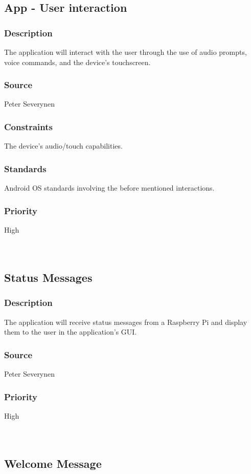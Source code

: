 \subsection{App - User interaction}
\subsubsection{Description}
The application will interact with the user through the use of audio prompts, voice commands, and the device's touchscreen.
\subsubsection{Source}
Peter Severynen
\subsubsection{Constraints}
The device's audio/touch capabilities.
\subsubsection{Standards}
Android OS standards involving the before mentioned interactions.
\subsubsection{Priority}
High\\
\\
\\
\subsection{Status Messages}
\subsubsection{Description}
The application will receive status messages from a Raspberry Pi and display them to the user in the application's GUI.
\subsubsection{Source}
Peter Severynen
\subsubsection{Priority}
High\\
\\
\\
\subsection{Welcome Message}

